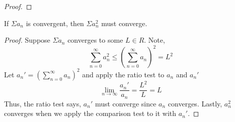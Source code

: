\documentclass[12pt]{article}
\newcommand{\nifty}{\lim_{n \rightarrow \infty}}
\newenvironment{claim}[2][Claim]{\begin{trivlist}
		\item[\hskip \labelsep {\bfseries #1}\hskip \labelsep {\bfseries #2}]}{\end{trivlist}}
\begin{document}
\begin{claim}{3.7.8}
	
\end{claim}
\begin{proof}
\end{proof}

\begin{claim}{3.7.11}
	If $\Sigma a_n$ is convergent, then $\Sigma a_n^2$ must converge.
\end{claim}
\begin{proof}
	Suppose $\Sigma a_n$ converges to some $L \in R$. Note,
	\[  \sum_{n = 0}^{\infty} a_n^2 \leq \left (\sum_{n = 0}^{\infty} a_n \right )^2 = L^2\]
	Let $a_n' = \left (\sum_{n = 0}^{\infty} a_n \right )^2 $ and apply the ratio test to $a_n$ and $a_n'$
	\[ \nifty \frac{a_n'}{a_n}  = \frac{L^2}{L} = L\]
	Thus, the ratio test says, $a_n'$ must converge since $a_n$ converges. Lastly, $a_n^2$ converges when we apply the comparison test to it with $a_n'$. 
\end{proof}
\end{document}
